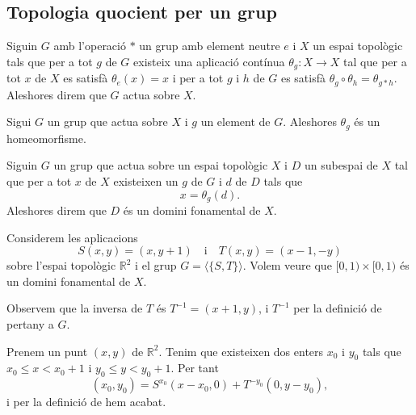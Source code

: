 \documentclass[../../Main.tex]{subfiles}
\begin{document}
	\subsection{Topologia quocient per un grup}
	\begin{definition}
		\label{def:acció d'un grup sobre un espai topològic}
		Siguin \(G\) amb l'operació \(\ast\) un grup amb element neutre \(e\) i \(X\) un espai topològic tals que per a tot \(g\) de \(G\) existeix una aplicació contínua \(\theta_{g}\colon X\longrightarrow X\) tal que per a tot \(x\) de \(X\) es satisfà \(\theta_{e}(x)=x\) i per a tot \(g\) i \(h\) de \(G\) es satisfà \(\theta_{g}\circ\theta_{h}=\theta_{g\ast h}\). Aleshores direm que \(G\) actua sobre \(X\).
	\end{definition}
	\begin{observation}
		\label{obs:els accions de grup en un espai topològic són homeomorfismes}
		Sigui \(G\) un grup que actua sobre \(X\) i \(g\) un element de \(G\). Aleshores \(\theta_{g}\) és un homeomorfisme.
	\end{observation} %
	\begin{definition}
		\label{def:domini fonamental}
		Siguin \(G\) un grup que actua sobre un espai topològic \(X\) i \(D\) un subespai de \(X\) tal que per a tot \(x\) de \(X\) existeixen un \(g\) de \(G\) i \(d\) de \(D\) tals que
		\[
		    x=\theta_{g}(d).
		\]
		Aleshores direm que \(D\) és un domini fonamental de \(X\).
	\end{definition}
	\begin{example}
		\label{ex:domini fonamental}
		Considerem les aplicacions
		\[
		    S(x,y)=(x,y+1)\quad\text{i}\quad T(x,y)=(x-1,-y)
		\]
		sobre l'espai topològic \(\mathbb{R}^{2}\) i el grup \(G=\langle\{S,T\}\rangle\).
		Volem veure que \([0,1)\times[0,1)\) és un domini fonamental de \(X\).
		\begin{solution} %
			Observem que la inversa de \(T\) és \(T^{-1}=(x+1,y)\), i \(T^{-1}\) per la definició de pertany a \(G\).
			
			Prenem un punt \((x,y)\) de \(\mathbb{R}^{2}\). Tenim que existeixen dos enters \(x_{0}\) i \(y_{0}\) tals que \(x_{0}\leq x<x_{0}+1\) i \(y_{0}\leq y<y_{0}+1\). Per tant
			\[
			    (x_{0},y_{0})=S^{x_{0}}(x-x_{0},0)+T^{-y_{0}}(0,y-y_{0}),
			\]
			i per la definició de  hem acabat.
		\end{solution} %
	\end{example}
\end{document}
